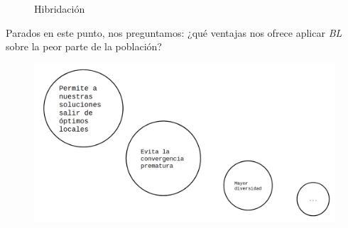 \begin{figure}[H]
	\centering
	\begin{minipage}{.75\linewidth}
		
		\begin{algorithm}[H] 
			\caption{Hibridación }
			\SetAlgoLined
			
			
			
		\end{algorithm}
	\end{minipage}
\end{figure}




Parados en este punto, nos preguntamos: ¿qué ventajas nos ofrece aplicar \textit{BL} sobre la peor parte de la población?

	\begin{figure}[H]
	\centering
	\includegraphics[scale=0.35]{img/def.png}
\end{figure}























